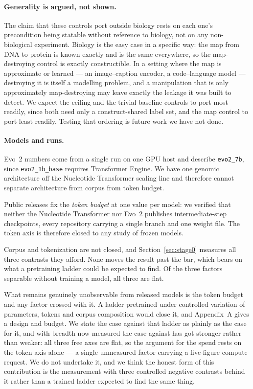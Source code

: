 \documentclass[11pt]{article}
\begin{document}
\paragraph{Generality is argued, not shown.} The claim that these controls port
outside biology rests on each one's precondition being statable without reference
to biology, not on any non-biological experiment. Biology is the easy case in a
specific way: the map from DNA to protein is known exactly and is the same
everywhere, so the map-destroying control is exactly constructible. In a setting
where the map is approximate or learned --- an image--caption encoder, a
code--language model --- destroying it is itself a modelling problem, and a
manipulation that is only approximately map-destroying may leave exactly the
leakage it was built to detect. We expect the ceiling and the trivial-baseline
controls to port most readily, since both need only a construct-shared label set,
and the map control to port least readily. Testing that ordering is future work we
have not done.

\paragraph{Models and runs.} Evo~2 numbers come from a single run on one GPU host and describe \texttt{evo2\_7b},
since \texttt{evo2\_1b\_base} requires Transformer Engine. We have one genomic
architecture off the Nucleotide Transformer scaling line and therefore cannot
separate architecture from corpus from token budget.

Public releases fix the \emph{token budget} at one value per model: we verified
that neither the Nucleotide Transformer nor Evo~2 publishes intermediate-step
checkpoints, every repository carrying a single branch and one weight file. The
token axis is therefore closed to any study of frozen models.

Corpus and tokenization are not closed, and Section~\ref{sec:stage0} measures all
three contrasts they afford. None moves the result past the bar, which bears on what
a pretraining ladder could be expected to find. Of the three factors separable
without training a model, all three are flat.

What remains genuinely unobservable from released models is the token budget and
any factor crossed with it. A ladder pretrained under controlled variation of
parameters, tokens and corpus composition would close it, and Appendix~A gives a
design and budget. We state the case against that ladder as plainly as the case
for it, and with breadth now measured the case against has got stronger rather than
weaker: all three free axes are flat, so the argument for the spend rests on the
token axis alone --- a single unmeasured factor carrying a five-figure compute
request. We do not undertake it, and we think the honest form of this contribution is
the measurement with three controlled negative contrasts behind it rather
than a trained ladder expected to find the same thing.
\end{document}
